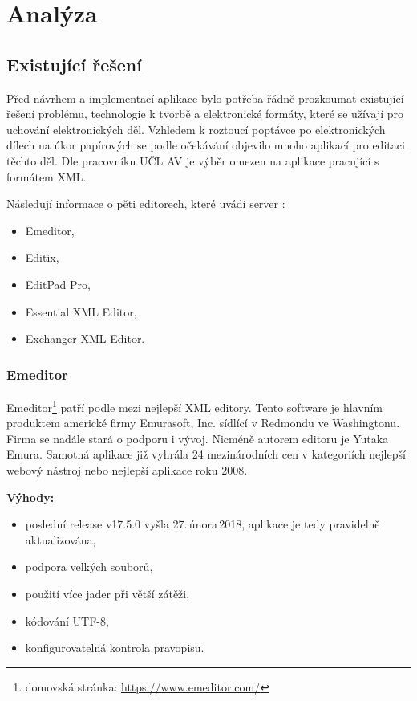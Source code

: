 \chapter{Analýza}

    \section{Existující řešení}
        Před návrhem a implementací aplikace bylo potřeba řádně prozkoumat existující řešení problému, technologie k tvorbě a elektronické formáty, které se užívají pro uchování elektronických děl. Vzhledem k roztoucí poptávce po elektronických dílech na úkor papírových se podle očekávání objevilo mnoho aplikací pro editaci těchto děl. Dle pracovníku UČL AV je výběr omezen na aplikace pracující s formátem XML.
        
        Následují informace o pěti editorech, které uvádí server \cite{tei-wiki}:
        \begin{itemize}
            \item Emeditor,
            \item Editix,
            \item EditPad Pro,
            \item Essential XML Editor,
            \item Exchanger XML Editor.
        \end{itemize}

        \subsection{Emeditor}
            Emeditor\footnote{domovská stránka: \url{https://www.emeditor.com/}} patří podle \cite{tei-wiki} mezi nejlepší XML editory. Tento software je hlavním produktem americké firmy Emurasoft, Inc. sídlící v Redmondu ve Washingtonu. Firma se nadále stará o podporu i vývoj. Nicméně autorem editoru je Yutaka Emura. Samotná aplikace již vyhrála 24 mezinárodních cen v kategoriích nejlepší webový nástroj nebo nejlepší aplikace roku 2008. 
            
            \textbf{Výhody:}
                \begin{itemize}
                    \item poslední release v17.5.0 vyšla 27.\,února\,2018, aplikace je tedy pravidelně aktualizována,
                    \item podpora velkých souborů,
                    \item použití více jader při větší zátěži,
                    \item kódování UTF-8,
                    \item konfigurovatelná kontrola pravopisu.
                \end{itemize}
                
